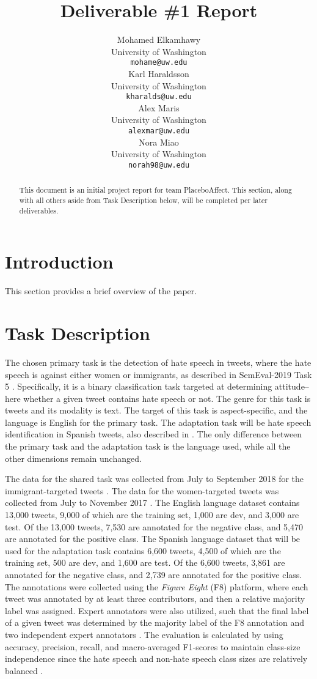 \documentclass[11pt,a4paper]{article}
\title{Deliverable \#1 Report}
\author{Mohamed Elkamhawy \\
  \small University of Washington \\
  \texttt{mohame@uw.edu} \\\And
  Karl Haraldsson \\
  \small University of Washington \\
  \texttt{kharalds@uw.edu} \\\And
  Alex Maris \\
  \small University of Washington \\
  \texttt{alexmar@uw.edu} \\\And
  Nora Miao \\
  \small University of Washington \\
  \texttt{norah98@uw.edu} \\
  }
\date{}
\begin{document}
\maketitle
\begin{abstract}
This document is an initial project report for team PlaceboAffect. This section, along with all others aside from Task Description below, will be completed per later deliverables. 
\end{abstract}

\section{Introduction}

This section provides a brief overview of the paper. 

\section{Task Description}
    
The chosen primary task is the detection of hate speech in tweets, where the hate speech is against either women or immigrants, as described in SemEval-2019 Task 5 \citep{basile-etal-2019-semeval}. Specifically, it is a binary classification task targeted at determining attitude–here whether a given tweet contains hate speech or not. The genre for this task is tweets and its modality is text. The target of this task is aspect-specific, and the language is English for the primary task. The adaptation task will be hate speech identification in Spanish tweets, also described in \citet{basile-etal-2019-semeval}. The only difference between the primary task and the adaptation task is the language used, while all the other dimensions remain unchanged.

The data for the shared task was collected from July to September 2018 for the immigrant-targeted tweets \citep{basile-etal-2019-semeval}. The data for the women-targeted tweets was collected from July to November 2017 \citep{fersini2018overview}. The English language dataset contains 13,000 tweets, 9,000 of which are the training set, 1,000 are dev, and 3,000 are test. Of the 13,000 tweets, 7,530 are annotated for the negative class, and 5,470 are annotated for the positive class. The Spanish language dataset that will be used for the adaptation task contains 6,600 tweets, 4,500 of which are the training set, 500 are dev, and 1,600 are test. Of the 6,600 tweets, 3,861 are annotated for the negative class, and 2,739 are annotated for the positive class. The annotations were collected using the \textit{Figure Eight} (F8) platform, where each tweet was annotated by at least three contributors, and then a relative majority label was assigned. Expert annotators were also utilized, such that the final label of a given tweet was determined by the majority label of the F8 annotation and two independent expert annotators \citep{basile-etal-2019-semeval}. The evaluation is calculated by using accuracy, precision, recall, and macro-averaged F1-scores to maintain class-size independence since the hate speech and non-hate speech class sizes are relatively balanced \citep{basile-etal-2019-semeval}.
\end{document}
